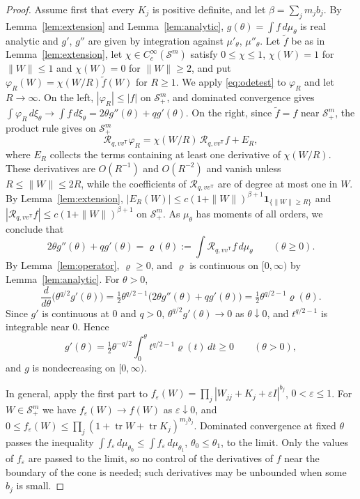 \documentclass{amsart}
\theoremstyle{definition}
\theoremstyle{remark}
\numberwithin{equation}{section}
\newcommand{\Sym}{\mathcal{S}}
\newcommand{\Rop}{\mathcal{R}}
\newcommand{\tr}{\operatorname{tr}}
\begin{document}
\begin{proof}
Assume first that every $K_j$ is positive definite, and let $\beta=\sum_jm_jb_j$. By Lemma~\ref{lem:extension} and Lemma~\ref{lem:analytic}, $g(\theta)=\int f\,d\mu_\theta$ is real analytic and $g'$, $g''$ are given by integration against $\mu'_\theta$, $\mu''_\theta$. Let $\tilde f$ be as in Lemma~\ref{lem:extension}, let $\chi\in C_c^\infty(\Sym^m)$ satisfy $0\le\chi\le1$, $\chi(W)=1$ for $\|W\|\le1$ and $\chi(W)=0$ for $\|W\|\ge2$, and put $\varphi_R(W)=\chi(W/R)\tilde f(W)$ for $R\ge1$. We apply \eqref{eq:odetest} to $\varphi_R$ and let $R\to\infty$. On the left, $|\varphi_R|\le|f|$ on $\Sym^m_+$, and dominated convergence gives $\int\varphi_R\,d\xi_\theta\to\int f\,d\xi_\theta=2\theta g''(\theta)+qg'(\theta)$. On the right, since $\tilde f=f$ near $\Sym^m_+$, the product rule gives on $\Sym^m_+$
\[
\Rop_{q,vv^{\mathsf T}}\varphi_R=\chi(W/R)\,\Rop_{q,vv^{\mathsf T}}f+E_R,
\]
where $E_R$ collects the terms containing at least one derivative of $\chi(W/R)$. These derivatives are $O(R^{-1})$ and $O(R^{-2})$ and vanish unless $R\le\|W\|\le2R$, while the coefficients of $\Rop_{q,vv^{\mathsf T}}$ are of degree at most one in $W$. By Lemma~\ref{lem:extension}, $|E_R(W)|\le c(1+\|W\|)^{\beta+1}\mathbf 1_{\{\|W\|\ge R\}}$ and $|\Rop_{q,vv^{\mathsf T}}f|\le c(1+\|W\|)^{\beta+1}$ on $\Sym^m_+$. As $\mu_\theta$ has moments of all orders, we conclude that
\begin{equation}\label{eq:ode}
2\theta g''(\theta)+qg'(\theta)=\varrho(\theta):=\int\Rop_{q,vv^{\mathsf T}}f\,d\mu_\theta\qquad(\theta\ge0).
\end{equation}
By Lemma~\ref{lem:operator}, $\varrho\ge0$, and $\varrho$ is continuous on $[0,\infty)$ by Lemma~\ref{lem:analytic}. For $\theta>0$,
\[
\frac{d}{d\theta}\bigl(\theta^{q/2}g'(\theta)\bigr)=\tfrac12\theta^{q/2-1}\bigl(2\theta g''(\theta)+qg'(\theta)\bigr)=\tfrac12\theta^{q/2-1}\varrho(\theta).
\]
Since $g'$ is continuous at $0$ and $q>0$, $\theta^{q/2}g'(\theta)\to0$ as $\theta\downarrow0$, and $t^{q/2-1}$ is integrable near $0$. Hence
\[
g'(\theta)=\tfrac12\theta^{-q/2}\int_0^\theta t^{q/2-1}\varrho(t)\,dt\ge0\qquad(\theta>0),
\]
and $g$ is nondecreasing on $[0,\infty)$.

In general, apply the first part to $f_\varepsilon(W)=\prod_j|W_{jj}+K_j+\varepsilon I|^{b_j}$, $0<\varepsilon\le1$. For $W\in\Sym^m_+$ we have $f_\varepsilon(W)\to f(W)$ as $\varepsilon\downarrow0$, and $0\le f_\varepsilon(W)\le\prod_j(1+\tr W+\tr K_j)^{m_jb_j}$. Dominated convergence at fixed $\theta$ passes the inequality $\int f_\varepsilon\,d\mu_{\theta_0}\le\int f_\varepsilon\,d\mu_{\theta_1}$, $\theta_0\le\theta_1$, to the limit. Only the values of $f_\varepsilon$ are passed to the limit, so no control of the derivatives of $f$ near the boundary of the cone is needed; such derivatives may be unbounded when some $b_j$ is small.
\end{proof}
\end{document}

